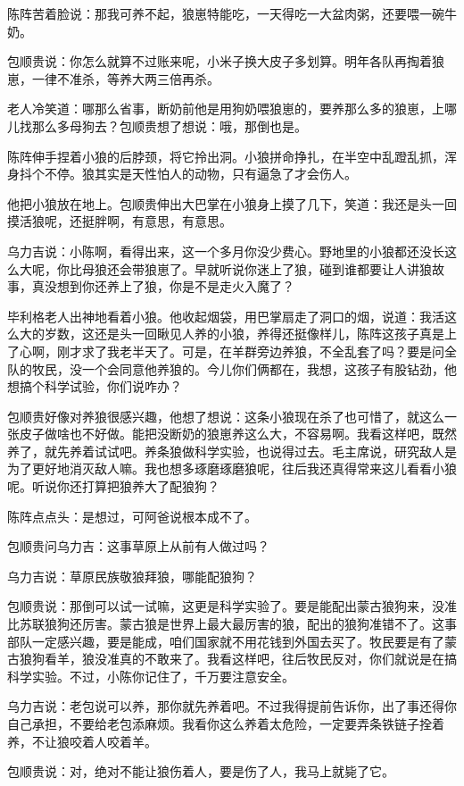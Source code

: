 \par 陈阵苦着脸说：那我可养不起，狼崽特能吃，一天得吃一大盆肉粥，还要喂一碗牛奶。
\par 包顺贵说：你怎么就算不过账来呢，小米子换大皮子多划算。明年各队再掏着狼崽，一律不准杀，等养大两三倍再杀。
\par 老人冷笑道：哪那么省事，断奶前他是用狗奶喂狼崽的，要养那么多的狼崽，上哪儿找那么多母狗去？包顺贵想了想说：哦，那倒也是。
\par 陈阵伸手捏着小狼的后脖颈，将它拎出洞。小狼拼命挣扎，在半空中乱蹬乱抓，浑身抖个不停。狼其实是天性怕人的动物，只有逼急了才会伤人。
\par 他把小狼放在地上。包顺贵伸出大巴掌在小狼身上摸了几下，笑道：我还是头一回摸活狼呢，还挺胖啊，有意思，有意思。
\par 乌力吉说：小陈啊，看得出来，这一个多月你没少费心。野地里的小狼都还没长这么大呢，你比母狼还会带狼崽了。早就听说你迷上了狼，碰到谁都要让人讲狼故事，真没想到你还养上了狼，你是不是走火入魔了？
\par 毕利格老人出神地看着小狼。他收起烟袋，用巴掌扇走了洞口的烟，说道：我活这么大的岁数，这还是头一回瞅见人养的小狼，养得还挺像样儿，陈阵这孩子真是上了心啊，刚才求了我老半天了。可是，在羊群旁边养狼，不全乱套了吗？要是问全队的牧民，没一个会同意他养狼的。今儿你们俩都在，我想，这孩子有股钻劲，他想搞个科学试验，你们说咋办？
\par 包顺贵好像对养狼很感兴趣，他想了想说：这条小狼现在杀了也可惜了，就这么一张皮子做啥也不好做。能把没断奶的狼崽养这么大，不容易啊。我看这样吧，既然养了，就先养着试试吧。养条狼做科学实验，也说得过去。毛主席说，研究敌人是为了更好地消灭敌人嘛。我也想多琢磨琢磨狼呢，往后我还真得常来这儿看看小狼呢。听说你还打算把狼养大了配狼狗？
\par 陈阵点点头：是想过，可阿爸说根本成不了。
\par 包顺贵问乌力吉：这事草原上从前有人做过吗？
\par 乌力吉说：草原民族敬狼拜狼，哪能配狼狗？
\par 包顺贵说：那倒可以试一试嘛，这更是科学实验了。要是能配出蒙古狼狗来，没准比苏联狼狗还厉害。蒙古狼是世界上最大最厉害的狼，配出的狼狗准错不了。这事部队一定感兴趣，要是能成，咱们国家就不用花钱到外国去买了。牧民要是有了蒙古狼狗看羊，狼没准真的不敢来了。我看这样吧，往后牧民反对，你们就说是在搞科学实验。不过，小陈你记住了，千万要注意安全。
\par 乌力吉说：老包说可以养，那你就先养着吧。不过我得提前告诉你，出了事还得你自己承担，不要给老包添麻烦。我看你这么养着太危险，一定要弄条铁链子拴着养，不让狼咬着人咬着羊。
\par 包顺贵说：对，绝对不能让狼伤着人，要是伤了人，我马上就毙了它。
